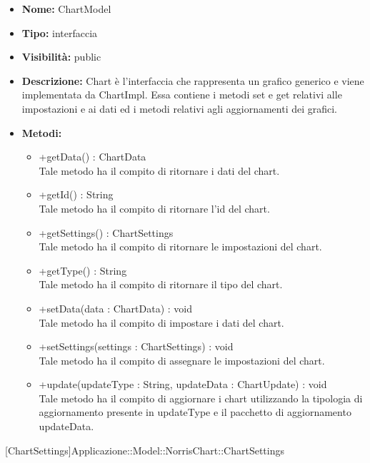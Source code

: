 			
			\begin{itemize}
			\item \textbf{Nome:} ChartModel
			\item \textbf{Tipo:} interfaccia
			
			\item \textbf{Visibilità:} public
			\item \textbf{Descrizione:} Chart è l'interfaccia che rappresenta un grafico generico e viene implementata da ChartImpl. Essa contiene i metodi set e get relativi alle impostazioni e ai dati ed i metodi relativi agli aggiornamenti dei grafici.
			\item \textbf{Metodi:}
				\begin{itemize}
				\setlength{\itemsep}{5pt}
				
					\item[\ding{111}] {{+getData() : ChartData}} \\ [1mm] Tale metodo ha il compito di ritornare i dati del chart.
					\item[\ding{111}] {{+getId() : String}} \\ [1mm] Tale metodo ha il compito di ritornare l'id del chart.
					\item[\ding{111}] {{+getSettings() : ChartSettings}} \\ [1mm] Tale metodo ha il compito di ritornare le impostazioni del chart.
					\item[\ding{111}] {{+getType() : String}} \\ [1mm] Tale metodo ha il compito di ritornare il tipo del chart.
					\item[\ding{111}] {{+setData(data : ChartData) : void}} \\ [1mm] Tale metodo ha il compito di impostare i dati del chart.
					\item[\ding{111}] {{+setSettings(settings : ChartSettings) : void}} \\ [1mm] Tale metodo ha il compito di assegnare le impostazioni del chart.
					\item[\ding{111}] {{+update(updateType : String, updateData : ChartUpdate) : void}} \\ [1mm] Tale metodo ha il compito di aggiornare i chart utilizzando la tipologia di aggiornamento presente in updateType e il pacchetto di aggiornamento updateData.
				\end{itemize}
		
			\end{itemize}

			
			[ChartSettings]{Applicazione::Model::NorrisChart::ChartSettings}
			

